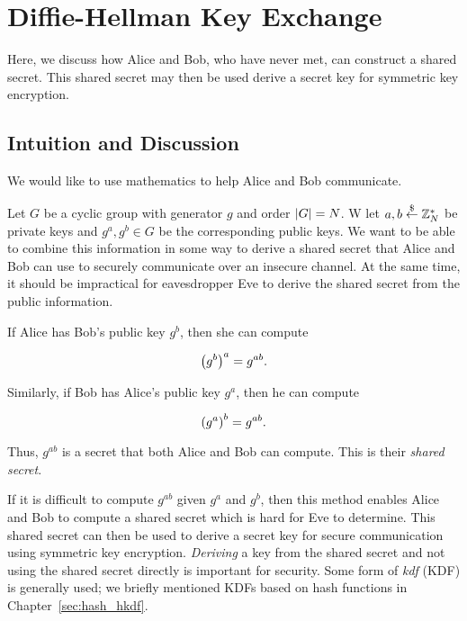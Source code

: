 \section{Diffie-Hellman Key Exchange}
\label{sec:public_diffie_hellman}

Here, we discuss how Alice and Bob, who have never met,
can construct a \gls{shared secret}.
This \gls{shared secret} may then be used derive a secret key
for \gls{symmetric key encryption}.

\subsection{Intuition and Discussion}

We would like to use mathematics to help Alice and Bob communicate.

Let $G$ be a \gls{cyclic group} with generator $g$ and order $\left| G \right| = N$.
W let $a,b\stackrel{\$}{\leftarrow}{}\mathbb{Z}_{N}^{*}$ be private keys and $g^{a},g^{b}\in G$
be the corresponding public keys.
We want to be able to combine this information in some way to derive
a \gls{shared secret} that Alice and Bob can use to securely communicate
over an \gls{insecure channel}.
At the same time, it should be impractical for eavesdropper Eve
to derive the \gls{shared secret} from the public information.

If Alice has Bob's public key $g^{b}$, then she can compute

\begin{equation}
    \left( g^{b} \right)^{a} = g^{ab}.
\end{equation}

\noindent
Similarly, if Bob has Alice's public key $g^{a}$, then he can compute

\begin{equation}
    \left( g^{a} \right)^{b} = g^{ab}.
\end{equation}

\noindent
Thus, $g^{ab}$ is a secret that both Alice and Bob can compute.
This is their \emph{\gls{shared secret}}.

If it is difficult to compute $g^{ab}$ given $g^{a}$ and $g^{b}$,
then this method enables Alice and Bob to compute a \gls{shared secret}
which is hard for Eve to determine.
This \gls{shared secret} can then be used to derive a secret key
for secure communication using \gls{symmetric key encryption}.
\emph{Deriving} a key from the \gls{shared secret} and
not using the shared secret directly is important for security.
Some form of \emph{\gls{kdf}} (KDF) is generally used;
we briefly mentioned KDFs based on \glspl{hash function}
in Chapter~\ref{sec:hash_hkdf}.

